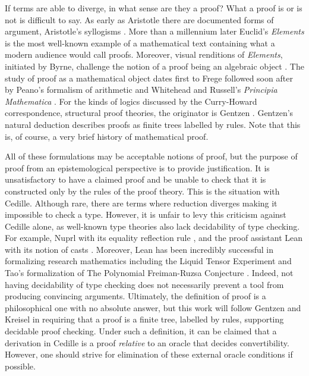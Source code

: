 If terms are able to diverge, in what sense are they a proof?
What a proof is or is not is difficult to say.
As early as Aristotle there are documented forms of argument, Aristotle's syllogisms \cite{aristotle}.
More than a millennium later Euclid's \textit{Elements} is the most well-known example of a mathematical text containing what a modern audience would call proofs.
Moreover, visual renditions of \textit{Elements}, initiated by Byrne, challenge the notion of a proof being an algebraic object \cite{byrne}.
The study of proof as a mathematical object dates first to Frege \cite{frege1879} followed soon after by Peano's formalism of arithmetic \cite{peano1889} and Whitehead and Russell's \textit{Principia Mathematica} \cite{whitehead}.
For the kinds of logics discussed by the Curry-Howard correspondence, structural proof theories, the originator is Gentzen \cite{gentzen1935_i,gentzen1935_ii}.
Gentzen's natural deduction describes proofs as finite trees labelled by rules.
Note that this is, of course, a very brief history of mathematical proof.

All of these formulations may be acceptable notions of proof, but the purpose of proof from an epistemological perspective is to provide justification.
It is unsatisfactory to have a claimed proof and be unable to check that it is constructed only by the rules of the proof theory.
This is the situation with Cedille.
Although rare, there are terms where reduction diverges making it impossible to check a type.
However, it is unfair to levy this criticism against Cedille alone, as well-known type theories also lack decidability of type checking.
For example, Nuprl with its equality reflection rule \cite{allen2000}, and the proof assistant Lean with its notion of casts \cite{moura2021}.
Moreover, Lean has been incredibly successful in formalizing research mathematics including the Liquid Tensor Experiment \cite{liquid_tensor_experiment} and Tao's formalization of The Polynomial Freiman-Ruzsa Conjecture \cite{tao2024_pfr}.
Indeed, not having decidability of type checking does not necessarily prevent a tool from producing convincing arguments.
Ultimately, the definition of proof is a philosophical one with no absolute answer, but this work will follow Gentzen and Kreisel in requiring that a proof is a finite tree, labelled by rules, supporting decidable proof checking.
Under such a definition, it can be claimed that a derivation in Cedille is a proof \textit{relative} to an oracle that decides convertibility.
However, one should strive for elimination of these external oracle conditions if possible.

